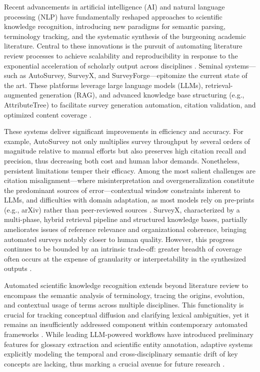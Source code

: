 \documentclass[sigconf]{acmart}
\begin{document}
Recent advancements in artificial intelligence (AI) and natural language processing (NLP) have fundamentally reshaped approaches to scientific knowledge recognition, introducing new paradigms for semantic parsing, terminology tracking, and the systematic synthesis of the burgeoning academic literature. Central to these innovations is the pursuit of automating literature review processes to achieve scalability and reproducibility in response to the exponential acceleration of scholarly output across disciplines \cite{ref111}. Seminal systems—such as AutoSurvey, SurveyX, and SurveyForge—epitomize the current state of the art. These platforms leverage large language models (LLMs), retrieval-augmented generation (RAG), and advanced knowledge base structuring (e.g., AttributeTree) to facilitate survey generation automation, citation validation, and optimized content coverage \cite{ref10,ref11,ref12,ref28,ref29,ref30,ref31,ref35,ref36,ref37,ref38,ref39,ref46,ref47,ref49,ref51,ref62,ref80,ref86,ref88,ref89,ref90,ref91,ref94,ref96,ref97,ref98,ref102,ref108}.

These systems deliver significant improvements in efficiency and accuracy. For example, AutoSurvey not only multiplies survey throughput by several orders of magnitude relative to manual efforts but also preserves high citation recall and precision, thus decreasing both cost and human labor demands. Nonetheless, persistent limitations temper their efficacy. Among the most salient challenges are citation misalignment—where misinterpretation and overgeneralization constitute the predominant sources of error—contextual window constraints inherent to LLMs, and difficulties with domain adaptation, as most models rely on pre-prints (e.g., arXiv) rather than peer-reviewed sources \cite{ref10,ref11,ref12}. SurveyX, characterized by a multi-phase, hybrid retrieval pipeline and structured knowledge bases, partially ameliorates issues of reference relevance and organizational coherence, bringing automated surveys notably closer to human quality. However, this progress continues to be bounded by an intrinsic trade-off: greater breadth of coverage often occurs at the expense of granularity or interpretability in the synthesized outputs \cite{ref11}.

Automated scientific knowledge recognition extends beyond literature review to encompass the semantic analysis of terminology, tracing the origins, evolution, and contextual usage of terms across multiple disciplines. This functionality is crucial for tracking conceptual diffusion and clarifying lexical ambiguities, yet it remains an insufficiently addressed component within contemporary automated frameworks \cite{ref111}. While leading LLM-powered workflows have introduced preliminary features for glossary extraction and scientific entity annotation, adaptive systems explicitly modeling the temporal and cross-disciplinary semantic drift of key concepts are lacking, thus marking a crucial avenue for future research \cite{ref89,ref111}.
\end{document}
